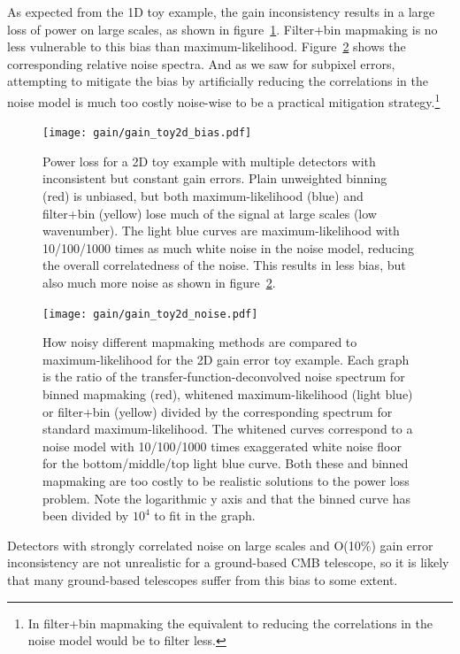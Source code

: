 \documentclass[twocolumn,apj]{aastex63}
\begin{document}
As expected from the 1D toy example, the gain inconsistency results
in a large loss of power on large scales, as shown in figure~\ref{fig:gain-tf-2d}.
Filter+bin mapmaking is no less vulnerable to this bias than maximum-likelihood.
Figure~\ref{fig:gain-noise-2d} shows the corresponding relative noise spectra.
And as we saw for subpixel errors, attempting to mitigate the bias by
artificially reducing the correlations in the noise model is much too
costly noise-wise to be a practical mitigation strategy.\footnote{In filter+bin
mapmaking the equivalent to reducing the correlations in the noise model would be
to filter less.}
\begin{figure}
	\centering
	\texttt{[image: gain/gain\_toy2d\_bias.pdf]}
	\caption{Power loss for a 2D toy example with multiple detectors
	with inconsistent but constant gain errors. Plain unweighted binning
	(red) is unbiased, but both maximum-likelihood (blue) and filter+bin
	(yellow) lose much of the signal at large scales (low wavenumber).
	The light blue curves are maximum-likelihood with 10/100/1000 times
	as much white noise in the noise model, reducing the overall correlatedness of the noise.
	This results in less bias, but also much more noise as shown in figure~\ref{fig:gain-noise-2d}.}
	\label{fig:gain-tf-2d}
\end{figure}
\begin{figure}
	\centering
	\texttt{[image: gain/gain\_toy2d\_noise.pdf]}
	\caption{How noisy different mapmaking methods are compared to maximum-likelihood
	for the 2D gain error toy example. Each graph is the ratio of the transfer-function-deconvolved
	noise spectrum for binned mapmaking (red), whitened maximum-likelihood (light blue)
	or filter+bin (yellow) divided by the corresponding spectrum for standard maximum-likelihood.
	The whitened curves correspond to a noise model with 10/100/1000 times exaggerated
	white noise floor for the bottom/middle/top light blue curve. Both these and binned mapmaking
	are too costly to be realistic solutions to the power loss problem. Note the logarithmic
	y axis and that the binned curve has been divided by $10^4$ to fit in the graph.}
	\label{fig:gain-noise-2d}
\end{figure}

Detectors with strongly correlated noise on large scales and O(10\%) gain
error inconsistency are not unrealistic for a ground-based CMB telescope,
so it is likely that many ground-based telescopes suffer from this bias to
some extent.
\end{document}

